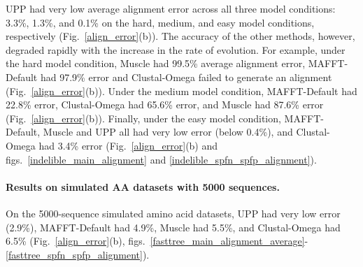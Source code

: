UPP had very low average alignment error across 
all three model conditions:
3.3\%, 1.3\%, and 0.1\% on
the hard, medium, and easy 
model conditions, respectively
(Fig.~\ref{align_error}(b)).
The accuracy of the other methods, however,
degraded rapidly with the increase
in the rate of evolution.   
For example, under the hard model condition,
Muscle had 99.5\% average alignment error,
MAFFT-Default had 97.9\% error 
and Clustal-Omega failed to generate an alignment
(Fig.~\ref{align_error}(b)).
Under the medium model condition,  
MAFFT-Default had 22.8\% error,  %
 Clustal-Omega had 65.6\% error, %
and Muscle had 87.6\% error (Fig.~\ref{align_error}(b)). %
Finally, under the easy model condition,
MAFFT-Default, Muscle and UPP all had very low error (below 0.4\%),
and
Clustal-Omega had 3.4\% error (Fig.~\ref{align_error}(b) and
figs.~\ref{indelible_main_alignment} and \ref{indelible_spfn_spfp_alignment}).

\paragraph{Results on simulated AA datasets with 5000 sequences. }
On the 5000-sequence simulated amino acid datasets,
UPP had very low error (2.9\%),
MAFFT-Default had 4.9\%, 
Muscle had 5.5\%,
and Clustal-Omega had 6.5\% (Fig.~\ref{align_error}(b),
figs.~\ref{fasttree_main_alignment_average}-\ref{fasttree_spfn_spfp_alignment}).

